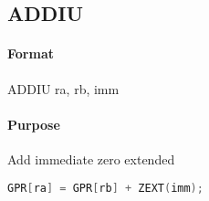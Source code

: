 \subsection{ADDIU}


\paragraph{Format} ADDIU ra, rb, imm

\paragraph{Purpose} Add immediate zero extended

\begin{lstlisting}[language=C]
    GPR[ra] = GPR[rb] + ZEXT(imm);
\end{lstlisting}
